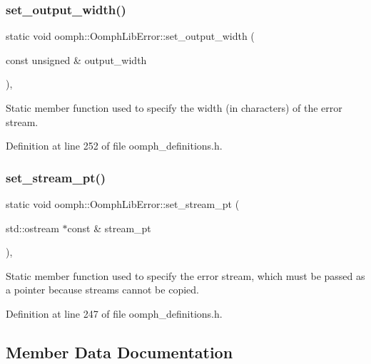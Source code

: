 \subsubsection{\texorpdfstring{set\+\_\+output\+\_\+width()}{set\_output\_width()}}
{\footnotesize\ttfamily static void oomph\+::\+Oomph\+Lib\+Error\+::set\+\_\+output\+\_\+width (\begin{DoxyParamCaption}\item[{const unsigned \&}]{output\+\_\+width }\end{DoxyParamCaption})\hspace{0.3cm}{\ttfamily [inline]}, {\ttfamily [static]}}



Static member function used to specify the width (in characters) of the error stream. 



Definition at line 252 of file oomph\+\_\+definitions.\+h.

\mbox{\label{classoomph_1_1OomphLibError_a64f1bfd5eaaafdef448c9a9f47be85cb}} 
\subsubsection{\texorpdfstring{set\+\_\+stream\+\_\+pt()}{set\_stream\_pt()}}
{\footnotesize\ttfamily static void oomph\+::\+Oomph\+Lib\+Error\+::set\+\_\+stream\+\_\+pt (\begin{DoxyParamCaption}\item[{std\+::ostream $\ast$const \&}]{stream\+\_\+pt }\end{DoxyParamCaption})\hspace{0.3cm}{\ttfamily [inline]}, {\ttfamily [static]}}



Static member function used to specify the error stream, which must be passed as a pointer because streams cannot be copied. 



Definition at line 247 of file oomph\+\_\+definitions.\+h.



\subsection{Member Data Documentation}
\mbox{\label{classoomph_1_1OomphLibError_a4f0a51dc7d73673d9cb17f3f4f9cd904}} 
